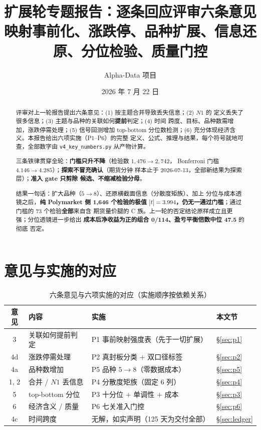 \documentclass[11pt, a4paper]{ctexart}
\title{\bfseries 扩展轮专题报告：逐条回应评审六条意见\\
\large 映射事前化、涨跌停、品种扩展、信息还原、分位检验、质量门控}
\author{Alpha-Data 项目}
\date{2026 年 7 月 22 日}
\newcommand{\code}[1]{\texttt{\small #1}}
\begin{document}
\maketitle

\begin{abstract}
\noindent
评审对上一轮报告提出六条意见：(1) 按主题合并导致丢失信息；(2) $N1$ 的
定义丢失了很多信息；(3) 主题与品种的关联如何\textbf{提前}判定；(4) 时间
跨度、目标、品种数需增加，涨跌停需处理；(5) 信号回测增加 top-bottom
分位数检测；(6) 充分体现经济含义。本报告给出六项实施（P1--P6）的完整
定义、公式、推理与结果，每个符号就地可查，全部数字由
\code{v4\_key\_numbers.py} 从产物计算。

三条铁律贯穿全轮：\textbf{门槛只升不降}（检验数 $1{,}476\to2{,}742$，
Bonferroni 门槛 $4.146\to4.285$）；\textbf{探索不冒充确认}（期货分钟
样本止于 2026-07-13，全部新结果为探索层）；\textbf{准入 gate 只剪除
候选、不缩减检验分母}。

结果一句话：扩大品种（$5\to8$）、还原横截面信息（分散度矩族）、加上
分位与成本透镜之后，\textbf{纯 Polymarket 侧 1{,}646 个检验的极值
$|t|=3.994$，仍无一通过门槛}；通过门槛的 73 个检验\textbf{全部}来自含
期货量价腿的 C 族。上一轮的否定结论原样成立且更强；分位透镜进一步给出
\textbf{成本后净收益为正的组合 0/114、盈亏平衡倍数中位 47.5} 的彻底
否定。
\end{abstract}

\tableofcontents

\section{意见与实施的对应}

\begin{table}[h!]\centering\small
\caption{六条意见与六项实施的对应（实施顺序按依赖关系）}
\begin{tabular}{clll}
\toprule
意见 & 内容 & 实施 & 本文节 \\
\midrule
3 & 关联如何提前判定 & P1 事前映射强度表（先于一切扩展） & \S\ref{sec:p1} \\
4d & 涨跌停需处理 & P2 真封板分类 $+$ 双口径标签 & \S\ref{sec:p2} \\
4a & 品种数增加 & P5 品种 $5\to8$（零数据成本） & \S\ref{sec:p5} \\
1, 2 & 合并 / $N1$ 丢信息 & P4 分散度矩族（固定 6 列） & \S\ref{sec:p4} \\
5 & top-bottom 分位 & P3 十分位 $+$ 单调性 $+$ 成本 & \S\ref{sec:p3} \\
6 & 经济含义 / 质量 & P6 七关准入门控 & \S\ref{sec:p6} \\
4c & 时间跨度 & 无解，如实声明（125 天为交付全部） & \S\ref{sec:ledger} \\
\bottomrule
\end{tabular}
\end{table}
\end{document}
